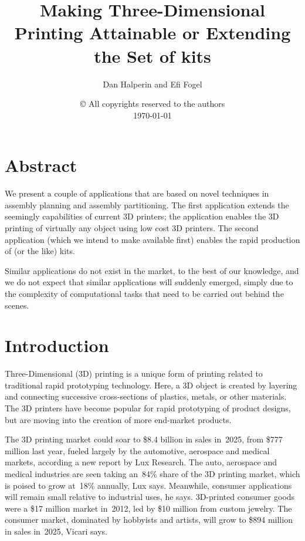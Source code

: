 \documentclass[11pt]{article}
\begin{document}
\title{Making Three-Dimensional Printing Attainable or Extending the
  Set of \lego{} kits}
\author{Dan Halperin and Efi Fogel}
\date{\copyright{} All copyrights reserved to the authors\\\today}
\maketitle
\section{Abstract}
\label{sec:abstract}
We present a couple of applications that are based on novel techniques
in assembly planning and assembly partitioning. The first application
extends the seemingly capabilities of current 3D printers; the
application enables the 3D printing of virtually any object using low
cost 3D printers. The second application (which we intend to make
available first) enables the rapid production of \lego{} (or the like)
kits.

Similar applications do not exist in the market, to the best of our
knowledge, and we do not expect that similar applications will
suddenly emerged, simply due to the complexity of computational 
tasks that need to be carried out behind the scenes.

\section{Introduction}
\label{sec:introduction}
Three-Dimensional (3D) printing is a unique form of printing
related to traditional rapid prototyping technology. Here, a 3D
object is created by layering and connecting successive cross-sections
of plastics, metals, or other materials. The 3D printers have become
popular for rapid prototyping of product designs, but are moving into
the creation of more end-market products.

The 3D printing market could soar to \$8.4 billion in sales in~2025,
from \$777 million last year, fueled largely by the automotive,
aerospace and medical markets, according a new report by Lux
Research. The auto, aerospace and medical industries are seen taking
an~84\% share of the 3D printing market, which is poised to grow
at~18\% annually, Lux says. Meanwhile, consumer applications will
remain small relative to industrial uses, he says. 3D-printed consumer
goods were a \$17 million market in~2012, led by \$10 million from
custom jewelry. The consumer market, dominated by hobbyists and
artists, will grow to \$894 million in sales in~2025, Vicari says.
\end{document}
